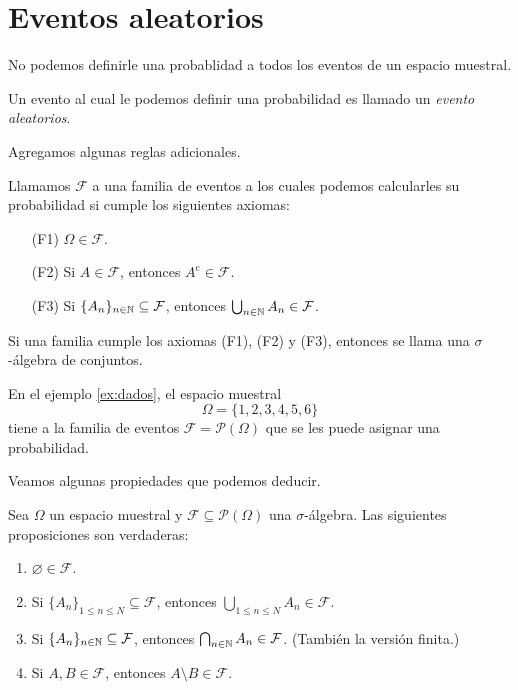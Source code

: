 \section{Eventos aleatorios}

No podemos definirle una probablidad a todos los eventos de un espacio muestral.

\begin{definition}
    Un evento al cual le podemos definir una probabilidad es llamado un \emph{evento aleatorios}.
\end{definition}

Agregamos algunas reglas adicionales.

\begin{definition}
    Llamamos $\mathcal{F}$ a una familia de eventos a los cuales podemos calcularles su probabilidad si cumple los siguientes axiomas:
    \begin{itemize}
        \item[(F1)] $\Omega \in \mathcal{F}$.
        \item[(F2)] Si $A \in \mathcal{F}$, entonces $A^{\textrm{c}} \in \mathcal{F}$.
        \item[(F3)] Si $\{A_n\}_{n \in \mathbb{N}} \subseteq \mathcal{F}$, entonces $\bigcup_{n \in \mathbb{N}} A_n \in \mathcal{F}$. 
    \end{itemize}
\end{definition}

\begin{remark}
    Si una familia cumple los axiomas (F1), (F2) y (F3), entonces se llama una $\sigma$-álgebra de conjuntos.
\end{remark}

\begin{example}
    En el ejemplo \ref{ex:dados}, el espacio muestral
    \begin{equation*}
        \Omega = \{ 1, 2, 3, 4, 5, 6 \}
    \end{equation*}
    tiene a la familia de eventos $\mathcal{F} = \mathcal{P}(\Omega)$ que se les puede asignar una probabilidad.
\end{example}

Veamos algunas propiedades que podemos deducir.

\begin{proposition}
    \label{prop:familia-eventos}
    Sea $\Omega$ un espacio muestral y $\mathcal{F} \subseteq \mathcal{P}(\Omega)$ una $\sigma$-álgebra. Las siguientes proposiciones son verdaderas:
    \begin{enumerate}
        \item $\varnothing \in \mathcal{F}$.
        \item Si $\{A_n\}_{1 \leq n \leq N} \subseteq \mathcal{F}$, entonces $\bigcup_{1 \leq n \leq N} A_n \in \mathcal{F}$.
        \item Si $\{A_n\}_{n \in \mathbb{N}} \subseteq \mathcal{F}$, entonces $\bigcap_{n \in \mathbb{N}} A_n \in \mathcal{F}$. (También la versión finita.)
        \item Si $A, B \in \mathcal{F}$, entonces $A \setminus B \in \mathcal{F}$.
    \end{enumerate}
\end{proposition}

